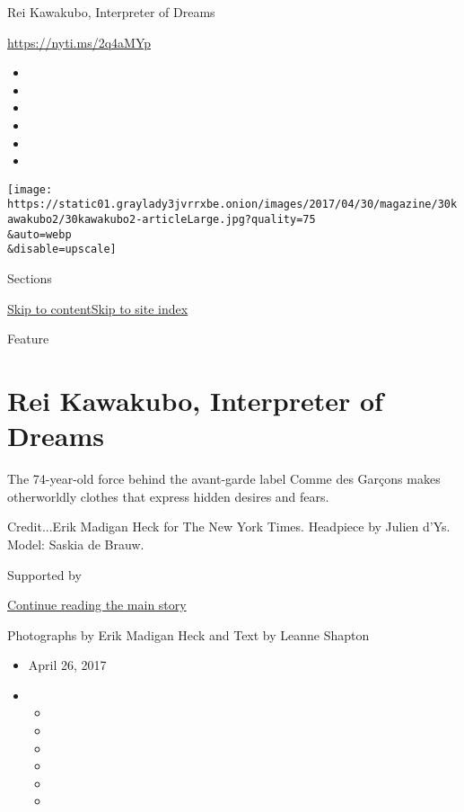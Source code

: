 Rei Kawakubo, Interpreter of Dreams

\url{https://nyti.ms/2q4aMYp}

\begin{itemize}
\item
\item
\item
\item
\item
\item
\end{itemize}

\texttt{[image: https://static01.graylady3jvrrxbe.onion/images/2017/04/30/magazine/30kawakubo2/30kawakubo2-articleLarge.jpg?quality=75\\\&auto=webp\\\&disable=upscale]}

Sections

\protect\hyperlink{site-content}{Skip to
content}\protect\hyperlink{site-index}{Skip to site index}

Feature

\hypertarget{rei-kawakubo-interpreter-of-dreams}{%
\section{Rei Kawakubo, Interpreter of
Dreams}\label{rei-kawakubo-interpreter-of-dreams}}

The 74-year-old force behind the avant-garde label Comme des Garçons
makes otherworldly clothes that express hidden desires and fears.

Credit...Erik Madigan Heck for The New York Times. Headpiece by Julien
d'Ys. Model: Saskia de Brauw.

Supported by

\protect\hyperlink{after-sponsor}{Continue reading the main story}

Photographs by Erik Madigan Heck and Text by Leanne Shapton

\begin{itemize}
\item
  April 26, 2017
\item
  \begin{itemize}
  \item
  \item
  \item
  \item
  \item
  \item
  \end{itemize}
\end{itemize}

